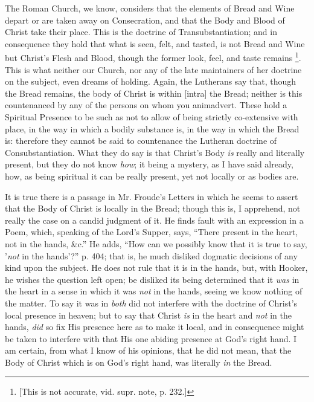 The Roman Church, we know, considers that the
elements of Bread and Wine depart or are taken away on Consecration,
and that the Body and Blood of Christ take their place. This is the
doctrine of Transubstantiation; and in consequence they hold that what
is seen, felt, and tasted, is not Bread and Wine but Christ's Flesh
and Blood, though the former look, feel, and taste remains \footnote{[This is not accurate, vid. supr. note, p. 232.]}. This is what neither our Church, nor any of the late
maintainers of her doctrine on the subject, even dreams of holding.
Again, the Lutherans say that, though the Bread remains, the body of
Christ is within [intra] the Bread; neither is this countenanced by
any of the persons on whom you animadvert. These hold a Spiritual
Presence to be such as not to allow of being strictly
co-extensive with place, in the way in which a bodily substance is, in
the way in which the Bread is: therefore they cannot be said to
countenance the Lutheran doctrine of Consubstantiation. What they do
say is that Christ's Body \emph{is} really and literally present, but
they do not know \emph{how}; it being a mystery, as I have said
already, how, as being spiritual it can be really present, yet not
locally or as bodies are.

It is true there is a passage in Mr. Froude's
Letters in which he seems to assert that the Body of Christ is locally
in the Bread; though this is, I apprehend, not really the case on a
candid judgment of it. He finds fault with an expression in a Poem,
which, speaking of the Lord's Supper, says, ``There present in the
heart, not in the hands, \&c.'' He adds, ``How can we possibly know
that it is true to say, '\emph{not} in the hands'?'' p. 404; that is,
he much disliked dogmatic decisions of any kind upon the subject. He
does not rule that it is in the hands, but, with Hooker, he wishes the
question left open; be disliked its being determined that it \emph{was}
in the heart in a sense in which it was \emph{not} in the hands,
seeing we know nothing of the matter. To say it was in \emph{both} did
not interfere with the doctrine of Christ's local presence in heaven;
but to say that Christ \emph{is} in the heart and \emph{not} in the
hands, \emph{did} so fix His presence here as to make it local, and in
consequence might be taken to interfere with that His one abiding
presence at God's right hand. I am certain, from what I know of his
opinions, that he did not mean, that the Body of Christ which is on
God's right hand, was literally \emph{in} the Bread.

